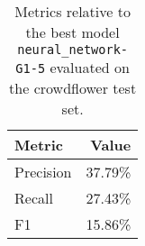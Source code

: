 \begin{table}[H]
\centering
\capstart
\begin{tabularx}{0.48\textwidth}{|X|r|}
\hline
Metric & Value \\
\hline
Precision & 37.79\% \\
Recall & 27.43\% \\
F1 & 15.86\% \\
\hline
\end{tabularx}
\caption{Metrics relative to the best model \texttt{neural\_network-G1-5} evaluated on the crowdflower test set.}
\label{tab:best_model_metrics_crowdflower_test}

\end{table}
